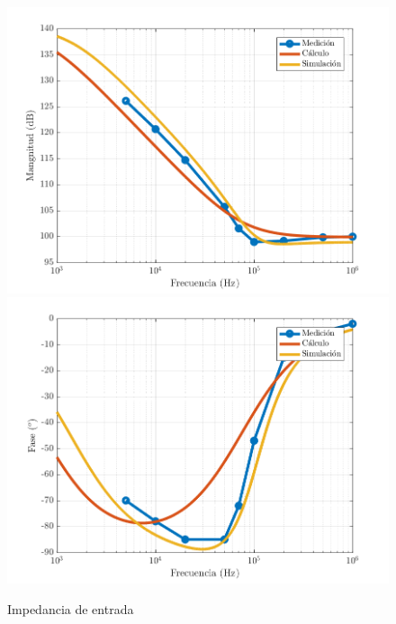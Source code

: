 \documentclass[../../main.tex]{subfiles}
\begin{document}
\begin{figure} [H]
	\centering
	\includegraphics[scale=0.75]{fotos/tc_tp2_ej2_Zin_mag.png}
	\includegraphics[scale=0.75]{fotos/tc_tp2_ej2_Zin_fase.png}
	\caption{Impedancia de entrada}
	\label{fig:ej2-zin}
\end{figure}
\end{document}
